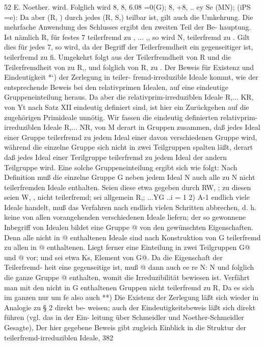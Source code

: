 \documentclass[11pt,a4paper]{article}
\theoremstyle{plain}
\theoremstyle{definition}
\begin{document}
52 
E. Noether. 
wird. 
Folglich wird 
8, \textdegree{}8, 6.08 =0(G); 
8, +8, .. 
ey Se (MN); 
(iPS =e): 
Da aber (R, ) durch jedes (R, S,) teilbar ist, gilt auch die Umkehrung. 
Die mehrfache Anwendung des Schlusses ergibt den zweiten Teil der Be- 
hauptung. 
Ist nämlich R, für festes 7 teilerfremd zu , ... ,, so wird 
N, teilerfremd zu . 
Gilt dies für jedes 7, so wird, da der Begriff der 
Teilerfremdheit 
ein gegenseitiger 
ist,  teilerfremd 
zu fi. 
Umgekehrt 
folgt aus 
der Teilerfremdheit 
von R und  die Teilerfremdheit von  
zu R,, und folglich von R, zu . 
Der Beweis für Existenz und Eindeutigkeit *`) der Zerlegung in teiler- 
fremd-irreduzible Ideale kommt, 
wie der entsprechende Beweis 
bei den 
relativprimen Idealen, auf eine eindeutige Gruppeneinteilung heraus. 
Da 
aber die relativprim-irreduziblen Ideale R,... 
KR, von Yt nach Satz XII 
eindeutig 
definiert 
sind, 
ist hier 
ein Zurückgehen 
auf die zugehörigen 
Primideale unnötig. 
Wir fassen 
die eindeutig 
definierten relativprim-irreduziblen 
Ideale 
R,... NR, von M derart in Gruppen zusammen, 
daß jedes Ideal einer 
Gruppe teilerfremd zu jedem Ideal einer davon 
verschiedenen Gruppe 
wird, während die einzelne Gruppe sich nicht in zwei Teilgruppen spalten 
läßt, derart daß jedes Ideal einer Terilgruppe teilerfremd zu jedem Ideal 
der andern Teilgruppe wird. 
Eine solche Gruppeneinteilung ergibt sich 
wie folgt: Nach Definition muß die einzelne Gruppe G neben jedem Ideal 
N auch alle zu N nicht teilerfremden Ideale enthalten. 
Seien diese etwa 
gegeben durch RW, ; zu diesen seien W, , nicht teilerfremd; sei allgemein 
R,; ...YG 
..i 
= 
1 
2) 
A-1 
endlich 
viele 
Ideale 
handelt, 
muß 
das Verfahren 
nach endlich vielen 
Schritten abbrechen, 
d. h. keine von allen vorangehenden verschiedenen 
Ideale liefern; der so gewonnene Inbegriff von Idealen bildet eine Gruppe @ 
von 
den gewünschten Eigenschaften. 
Denn alle nicht in @ enthaltenen 
Ideale sind nach Konstruktion von G teilerfremd zu allen in @ enthaltenen. 
Liegt ferner eine Einteilung in zwei Teilgruppen G@ und @ vor; und 
sei etwa Ks, Element 
von G@. 
Da die Eigenschaft der Teilerfremd- 
heit eine gegenseitige ist, muß @ dann auch ee re N: 
N und folglich die ganze Gruppe @ enthalten, womit 
die Irreduzibilität 
bewiesen ist. 
Verfährt man 
mit den nicht 
in G enthaltenen Gruppen 
nicht teilerfremd zu R, 
Da 
es 
sich im ganzen 
nur um 
fe 
also auch 
**) Die Existenz der Zerlegung läßt sich wieder in Analogie zu \S{} 2 direkt be- 
weisen; auch der Eindeutigkeitsbeweis läßt sich direkt führen (vgl. das in der Ein- 
leitung über Schmeidler und Noether-Schmeidler Gesagte), 
Der hier gegebene Beweis 
gibt zugleich Einblick in die Struktur der teilerfremd-irreduziblen Ideale, 
382
\end{document}
